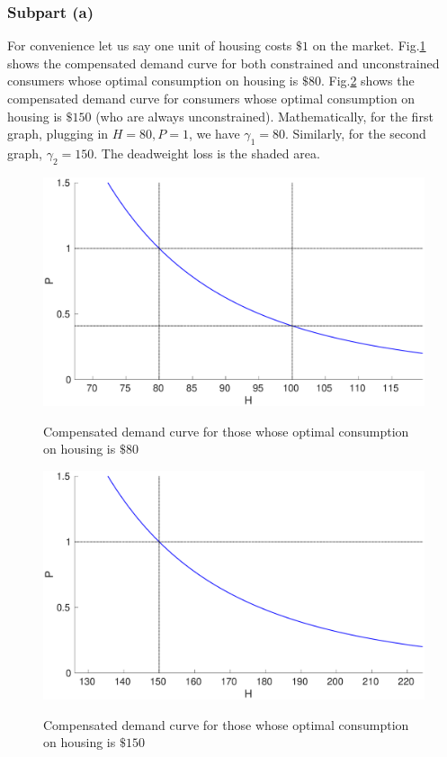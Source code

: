 \documentclass{article}
\begin{document}
\subsubsection{Subpart (a)}
For convenience let us say one unit of housing costs $\$1$ on the market. Fig.\ref{fig1} shows the compensated demand curve for both constrained and unconstrained consumers whose optimal consumption on housing is $\$80$. Fig.\ref{fig2} shows the compensated demand curve for consumers whose optimal consumption on housing is $\$150$ (who are always unconstrained). Mathematically, for the first graph, plugging in $H=80,P=1$, we have $\gamma_1=80$. Similarly, for the second graph, $\gamma_2=150$. The deadweight loss is the shaded area.
\begin{figure}[!htbp]
	\centering
	\includegraphics[width=12cm]{figure1.eps}\\
	\caption{Compensated demand curve for those whose optimal consumption on housing is $\$80$}\label{fig1}
\end{figure}

\begin{figure}[!htbp]
	\centering
	\includegraphics[width=12cm]{figure2.eps}\\
	\caption{Compensated demand curve for those whose optimal consumption on housing is $\$150$}\label{fig2}
\end{figure}
\end{document}
